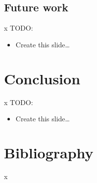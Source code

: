 \documentclass{beamer}
\newlength{\wideitemsep}
\let\olditem\item
\renewcommand{\item}[1][\wideitemsep]{\setlength{\itemsep}{#1}\olditem}
\begin{document}
\subsection{Future work}
\begin{frame}{x}{}
TODO:
\begin{itemize}
\item Create this slide\ldots
\end{itemize}
\end{frame}



\section{Conclusion}
\begin{frame}{x}{}
TODO:
\begin{itemize}
\item Create this slide\ldots
\end{itemize}
\end{frame}



\section*{Bibliography}
\begin{frame}[allowframebreaks]{x}{}
\nocite{all, the, things}

\tiny{}
\end{frame}
\end{document}
